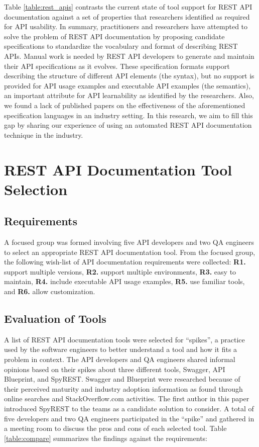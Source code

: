 \documentclass[10pt, conference]{IEEEtran}
\begin{document}
Table \ref{table:rest_apis} contrasts the current state of tool support for REST API documentation against a set of properties that researchers identified as required for API usability. In summary, practitioners and researchers have attempted to solve the problem of REST API documentation by proposing candidate specifications to standardize the vocabulary and format of describing REST APIs. Manual work is needed by REST API developers to generate and maintain their API specifications as it evolves. These specification formats support describing the structure of different API elements (the syntax), but no support is provided for API usage examples and executable API examples (the semantics), an important attribute for API learnability as identified by the researchers. Also, we found a lack of published papers on the effectiveness of the aforementioned specification languages in an industry setting. In this research, we aim to fill this gap by sharing our experience of using an automated REST API documentation technique in the industry.

\section{REST API Documentation Tool Selection}

\subsection{Requirements}

A focused group was formed involving five API developers and two QA engineers to select an appropriate REST API documentation tool. From the focused group, the following wish-list of API documentation requirements were collected: \textbf{R1.} support multiple versions, \textbf{R2.} support multiple environments, \textbf{R3.} easy to maintain, \textbf{R4.} include executable API usage examples, \textbf{R5.} use familiar tools, and \textbf{R6.} allow customization.

\subsection{Evaluation of Tools}
A list of REST API documentation tools were selected for ``spikes'', a practice used by the software engineers to better understand a tool and how it fits a problem in context. The API developers and QA engineers shared informal opinions based on their spikes about three different tools, Swagger, API Blueprint, and SpyREST. Swagger and Blueprint were researched because of their perceived maturity and industry adoption information as found through online searches and StackOverflow.com activities. The first author in this paper introduced SpyREST to the teams as a candidate solution to consider. A total of five developers and two QA engineers participated in the ``spike'' and gathered in a meeting room to discuss the pros and cons of each selected tool. Table \ref{table:compare} summarizes the findings against the requirements:
\end{document}
